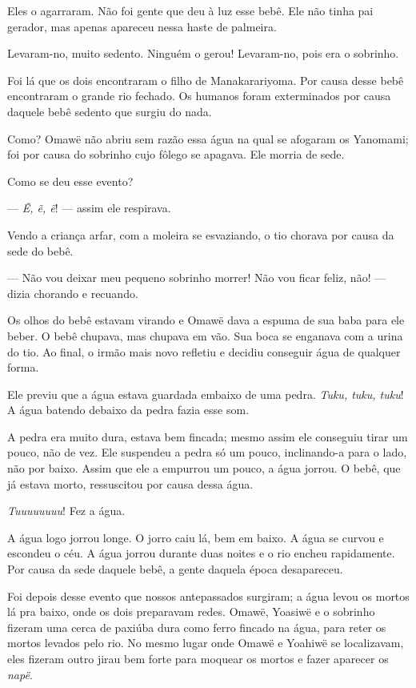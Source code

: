 Eles o agarraram. Não foi gente que deu à luz esse bebê. Ele não
tinha pai gerador, mas apenas apareceu nessa haste de palmeira. 

Levaram-no, muito sedento. Ninguém o gerou! Levaram-no, pois era o
sobrinho. 

Foi lá que os dois encontraram o filho de Manakarariyoma. Por causa
desse bebê encontraram o grande rio fechado. Os humanos foram
exterminados por causa daquele bebê sedento que surgiu do nada. 

Como? Omawë não abriu sem razão essa água na qual se afogaram os
Yanomami; foi por causa do sobrinho cujo fôlego se apagava. Ele morria de
sede. 

Como se deu esse evento?

--- \textit{Ẽ, ẽ, ẽ}! --- assim ele respirava. 

Vendo a criança arfar, com a moleira se esvaziando, o tio chorava por
causa da sede do bebê. 

--- Não vou deixar meu pequeno sobrinho morrer! Não vou ficar feliz,
não! --- dizia chorando e recuando. 

Os olhos do bebê estavam virando e Omawë dava a espuma de sua baba para
ele beber. O bebê chupava, mas chupava em vão. Sua boca se enganava com a
urina do tio. Ao final, o irmão mais novo refletiu e decidiu conseguir água de qualquer forma. 

Ele previu que a água estava guardada embaixo de uma pedra. \textit{Tuku, tuku, tuku}! A água batendo debaixo da pedra fazia esse som. 

A pedra era muito dura, estava bem fincada; mesmo assim ele conseguiu
tirar um pouco, não de vez. Ele suspendeu a pedra só um pouco,
inclinando-a para o lado, não por baixo. Assim que ele a empurrou um pouco, a
água jorrou. O bebê, que já estava morto, ressuscitou por causa dessa
água.

\textit{Tuuuuuuuu}! Fez a água. 

A água logo jorrou longe. O jorro caiu lá, bem em baixo. A água se
curvou e escondeu o céu. A água jorrou durante duas noites e o rio
encheu rapidamente. Por causa da sede daquele bebê, a gente daquela
época desapareceu. 

Foi depois desse evento que nossos antepassados surgiram; a água levou
os mortos lá pra baixo, onde os dois preparavam redes. Omawë, Yoasiwë e o
sobrinho fizeram uma cerca de paxiúba dura como ferro fincado na água,
para reter os mortos levados pelo rio. No mesmo lugar onde Omawë e
Yoahiwë se localizavam, eles fizeram outro jirau bem forte para moquear
os mortos e fazer aparecer os \textit{napë}. 

